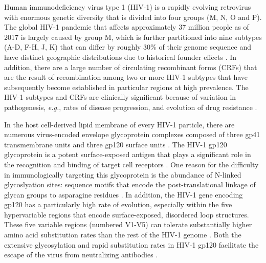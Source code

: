 \documentclass[12pt]{article}
\begin{document}
Human immunodeficiency virus type 1 (HIV-1) is a rapidly evolving retrovirus with enormous genetic diversity that is divided into four groups (M, N, O and P).
The global HIV-1 pandemic that affects approximately 37 million people as of 2017 \citep{WHO:2018} is largely caused by group M, which is further partitioned into nine subtypes (A-D, F-H, J, K) that can differ by roughly 30\% of their genome sequence \citep{korber2001evolutionary} and have distinct geographic distributions due to historical founder effects \citep{Tebit:2011}. 
In addition, there are a large number of circulating recombinant forms (CRFs) that are the result of recombination among two or more HIV-1 subtypes that have subsequently become established in particular regions at high prevalence.
The HIV-1 subtypes and CRFs are clinically significant because of variation in pathogenesis, \textit{e.g.}, rates of disease progression, and evolution of drug resistance \citep{Kiwanuka:2008, Vasan:2006, Wainberg:2004, Arien:2007}.

In the host cell-derived lipid membrane of every HIV-1 particle, there are numerous virus-encoded envelope glycoprotein complexes composed of three gp41 transmembrane units and three gp120 surface units \citep{tran2012structural}.
The HIV-1 gp120 glycoprotein is a potent surface-exposed antigen that plays a significant role in the recognition and binding of target cell receptors \citep{kwong1998structure}. 
One reason for the difficulty in immunologically targeting this glycoprotein is the abundance of N-linked glycoslyation sites: sequence motifs that encode the post-translational linkage of glycan groups to asparagine residues \citep{zhang2004tracking}.  
In addition, the HIV-1 gene encoding gp120 has a particularly high rate of evolution, especially within the five hypervariable regions that encode surface-exposed, disordered loop structures. 
These five variable regions (numbered V1-V5) can tolerate substantially higher amino acid substitution rates than the rest of the HIV-1 genome \citep{Li:1988}.
Both the extensive glycosylation and rapid substitution rates in HIV-1 gp120 facilitate the escape of the virus from neutralizing antibodies \citep{wood2009hiv}.
\end{document}
